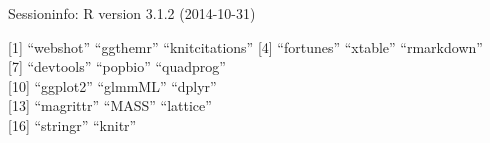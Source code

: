 \documentclass[ignorenonframetext,]{beamer}
\begin{document}
\begin{frame}{\small{Sessioninfo: R version 3.1.2 (2014-10-31)}}

{[}1{]} ``webshot'' ``ggthemr'' ``knitcitations'' {[}4{]} ``fortunes''
``xtable'' ``rmarkdown''\\ {[}7{]} ``devtools'' ``popbio''
``quadprog''\\{[}10{]} ``ggplot2'' ``glmmML'' ``dplyr''\\{[}13{]}
``magrittr'' ``MASS'' ``lattice''\\{[}16{]} ``stringr'' ``knitr''

\flushright{\textit{\textcolor{magenta}{Questions?}} \faComments}

\end{frame}
\end{document}
